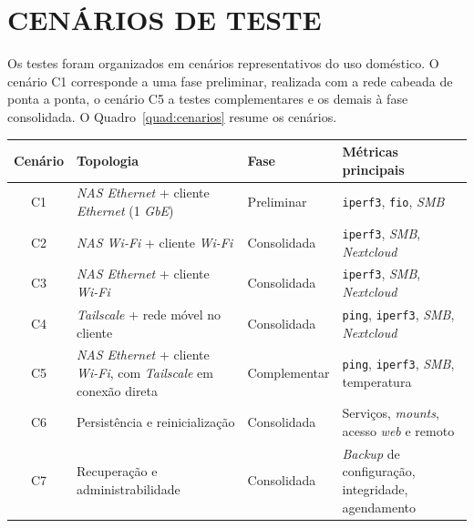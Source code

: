 \section{CENÁRIOS DE TESTE}

Os testes foram organizados em cenários representativos do uso doméstico. O cenário C1 corresponde a uma fase preliminar, realizada com a rede cabeada de ponta a ponta, o cenário C5 a testes complementares e os demais à fase consolidada. O Quadro~\ref{quad:cenarios} resume os cenários.

\begin{quadro}[H]
    \centering
    \small
    \renewcommand{\arraystretch}{1.15}
    \begin{tabularx}{\linewidth}{|c|>{\raggedright\arraybackslash}X|>{\raggedright\arraybackslash}X|>{\raggedright\arraybackslash}X|}
        \hline
        \textbf{Cenário} & \textbf{Topologia} & \textbf{Fase} & \textbf{Métricas principais} \\
        \hline
        \hline
        C1 & \textit{NAS Ethernet} + cliente \textit{Ethernet} (1 \textit{GbE}) & Preliminar & \texttt{iperf3}, \texttt{fio}, \textit{SMB} \\
        \hline
        C2 & \textit{NAS Wi-Fi} + cliente \textit{Wi-Fi} & Consolidada & \texttt{iperf3}, \textit{SMB}, \textit{Nextcloud} \\
        \hline
        C3 & \textit{NAS Ethernet} + cliente \textit{Wi-Fi} & Consolidada & \texttt{iperf3}, \textit{SMB}, \textit{Nextcloud} \\
        \hline
        C4 & \textit{Tailscale} + rede móvel no cliente & Consolidada & \texttt{ping}, \texttt{iperf3}, \textit{SMB}, \textit{Nextcloud} \\
        \hline
        C5 & \textit{NAS Ethernet} + cliente \textit{Wi-Fi}, com \textit{Tailscale} em conexão direta & Complementar & \texttt{ping}, \texttt{iperf3}, \textit{SMB}, temperatura \\
        \hline
        C6 & Persistência e reinicialização & Consolidada & Serviços, \textit{mounts}, acesso \textit{web} e remoto \\
        \hline
        C7 & Recuperação e administrabilidade & Consolidada & \textit{Backup} de configuração, integridade, agendamento \\
        \hline
    \end{tabularx}
    \vspace{0.2cm}
    \fonteautoria
\end{quadro}

